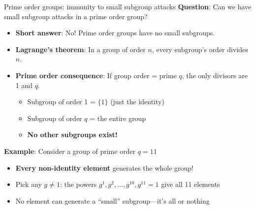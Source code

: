 \documentclass[aspectratio=169, lualatex, handout]{beamer}
\begin{document}
\begin{frame}{Prime order groups: immunity to small subgroup attacks}
	\textbf{Question}: Can we have small subgroup attacks in a prime order group?
	\begin{itemize}[<+->]
		\item \textbf{Short answer}: No! Prime order groups have no small subgroups.
		\item \textbf{Lagrange's theorem}: In a group of order $n$, every subgroup's order divides $n$.
		\item \textbf{Prime order consequence}: If group order = prime $q$, the only divisors are 1 and $q$.
		      \begin{itemize}
			      \item Subgroup of order 1 = $\{1\}$ (just the identity)
			      \item Subgroup of order $q$ = the entire group
			      \item \textbf{No other subgroups exist!}
		      \end{itemize}
	\end{itemize}
	\vspace{0.5cm}
	\textbf{Example}: Consider a group of prime order $q = 11$
	\begin{itemize}[<+->]
		\item \textbf{Every non-identity element} generates the whole group!
		\item Pick any $g \neq 1$: the powers $g^1, g^2, \ldots, g^{10}, g^{11} = 1$ give all 11 elements
		\item No element can generate a ``small'' subgroup—it's all or nothing
	\end{itemize}
\end{frame}
\end{document}
